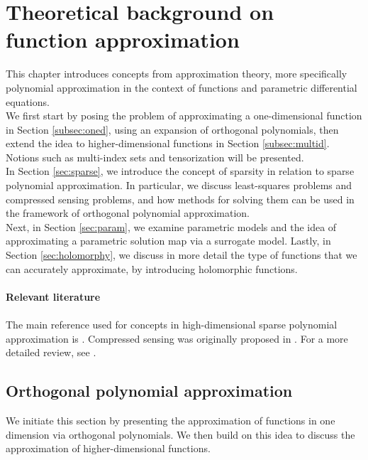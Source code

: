 \documentclass[12pt, oneside]{report}   	%
\begin{document}
\newpage


\chapter{Theoretical background on function approximation}
\label{chap:functions}

This chapter introduces concepts from approximation theory, more specifically polynomial approximation in the context of functions and parametric differential equations.\\
We first start by posing the problem of approximating a one-dimensional function in Section \ref{subsec:oned}, using an expansion of orthogonal polynomials, then extend the idea to higher-dimensional functions in Section \ref{subsec:multid}. Notions such as multi-index sets and tensorization will be presented.\\
In Section \ref{sec:sparse}, we introduce the concept of sparsity in relation to sparse polynomial approximation. In particular, we discuss least-squares problems and compressed sensing problems, and how methods for solving them can be used in the framework of orthogonal polynomial approximation.\\
Next, in Section \ref{sec:param}, we examine parametric models and the idea of approximating a parametric solution map via a surrogate model. Lastly, in Section \ref{sec:holomorphy}, we discuss in more detail the type of functions that we can accurately approximate, by introducing holomorphic functions.\\\\
\textbf{Relevant literature}\\\\
The main reference used for concepts in high-dimensional sparse polynomial approximation is \cite{sparsepoly}. Compressed sensing was originally proposed in \cite{1580791}. For a more detailed review, see \cite{foucart2013invitation, donoho2006compressed, adcock2021compressive}.


\section{Orthogonal polynomial approximation}
\label{sec:ortho}

We initiate this section by presenting the approximation of functions in one dimension via orthogonal polynomials. We then build on this idea to discuss the approximation of higher-dimensional functions.
\end{document}
